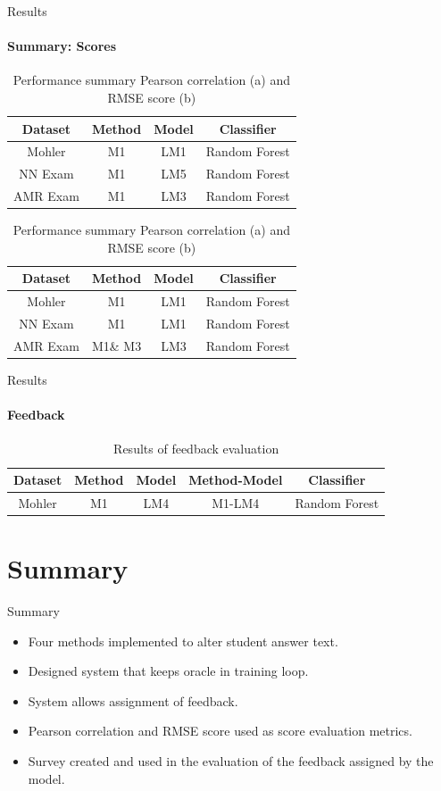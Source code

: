 \documentclass[aspectratio=169]{beamer}
\begin{document}
\begin{frame}{Results}
	\framesubtitle{Summary: Scores}
	\begin{table}
	\begin{subtable}[c]{0.7\textwidth}
				\centering
				\begin{tabular}{|c|c|c|c|}
					\hline
					Dataset & Method & Model & Classifier \\
					\hline
					Mohler & M1 & LM1& Random Forest \\
					\hline
					NN Exam & M1 & LM5 & Random Forest\\
					\hline
					AMR Exam & M1& LM3 & Random Forest\\
					\hline	
				\end{tabular}
			\subcaption{}
			\end{subtable}
		\begin{subtable}[c]{0.7\textwidth}
			
			\centering
			\begin{tabular}{|c|c|c|c|}
				\hline
				Dataset & Method & Model & Classifier \\
				\hline
				Mohler & M1 & LM1& Random Forest \\
				\hline
				NN Exam & M1 & LM1 & Random Forest\\
				\hline
				AMR Exam & M1\& M3 & LM3 & Random Forest\\
				\hline	
			\end{tabular}
			\subcaption{}
		\end{subtable}
	\caption{Performance summary Pearson correlation (a) and RMSE score (b)}
\end{table}
\end{frame}

\begin{frame}{Results}
	\framesubtitle{Feedback}
	\begin{table}
		\centering
		\begin{tabular}{|c|c|c|c|c|}
			\hline
			Dataset & Method & Model & Method-Model & Classifier \\
			\hline
			Mohler & M1 & LM4 & M1-LM4 & Random Forest \\
			\hline
		\end{tabular}
	\caption{Results of feedback evaluation}
	\end{table}
\end{frame}
\section{Summary}
\begin{frame}{Summary}
	\begin{itemize}
		\item Four methods implemented to alter student answer text.
		\item Designed system that keeps oracle in training loop.
		\item System allows assignment of feedback.
		\item Pearson correlation and RMSE score used as score evaluation metrics.
		\item Survey created and used in the evaluation of the feedback assigned by the model.
	\end{itemize}
\end{frame}
\end{document}

